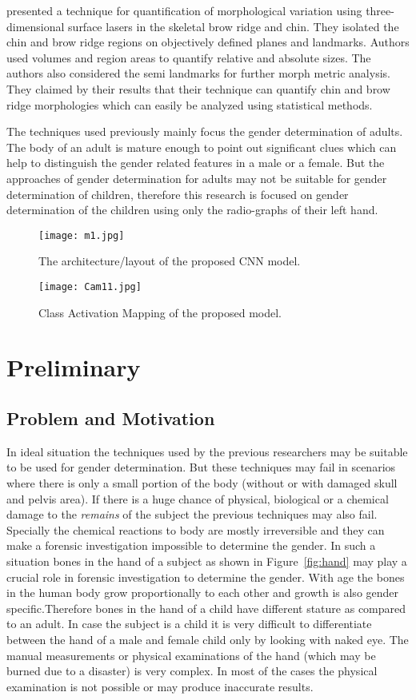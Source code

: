 \documentclass{bioinfo}
\begin{document}
\citep{garvin12} presented a technique for quantification of morphological variation using three-dimensional surface lasers in the skeletal brow ridge and chin. They isolated the chin and brow ridge regions on objectively defined planes and landmarks. Authors used volumes and region areas to quantify relative and absolute sizes. The authors also considered the semi landmarks for further morph metric analysis. They claimed by their results that their technique can quantify chin and  brow ridge morphologies which can easily be analyzed using statistical methods.


The techniques used previously mainly focus the gender determination of adults. The body of an adult is mature enough to point out significant clues which can help to distinguish the gender related features in a male or a female. But the approaches of gender determination for adults may not be suitable for gender determination of children, therefore this research is focused on gender determination of the children using only the radio-graphs of their left hand. 
 \begin{figure*}[h]%
\texttt{[image: m1.jpg]}
\caption{The architecture/layout of the proposed CNN model.}
\label{fig:arccnn}
\end{figure*}
\begin{figure*}[]%
\texttt{[image: Cam11.jpg]}
\caption{Class Activation Mapping of the proposed model.}
\label{fig:cam}
\end{figure*}

\section{Preliminary}
\subsection{Problem and Motivation}
In ideal situation the techniques used by the previous researchers may be suitable to be used for gender determination. But these techniques may fail in scenarios where there is only a small portion of the body (without or with damaged skull and pelvis area). If there is a huge chance of physical, biological or  a chemical damage to the \textit{remains} of the subject the previous techniques may also fail. Specially the chemical reactions to body are mostly irreversible and they can make a forensic investigation impossible to determine the gender. In such a situation bones in the hand of a subject as shown in Figure~\ref{fig:hand} may play a crucial role in forensic investigation to determine the gender. With age the bones in the human body grow proportionally to each other and growth is also gender specific.Therefore bones in the hand of a child have different stature as compared to an adult. In case the subject is a child it is very difficult to differentiate between the hand of a male and female child only by looking with naked eye. The manual measurements or physical examinations of the hand (which may be burned due to a disaster) is very complex. In most of the cases the physical examination is not possible or may produce inaccurate results.\\
\end{document}
